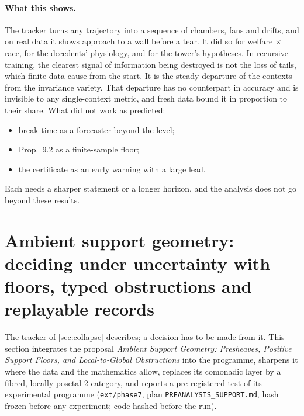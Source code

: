 \documentclass[11pt]{article}
\theoremstyle{definition}
\theoremstyle{remark}
\begin{document}
\paragraph{What this shows.} The tracker turns any trajectory into a sequence of chambers, fans and drifts, and on real data it shows
approach to a wall before a tear. It did so for welfare $\times$ race, for the decedents' physiology, and for the tower's hypotheses.
In recursive training, the clearest signal of information being destroyed is not the loss of tails, which finite data cause from the
start. It is the steady departure of the contexts from the invariance variety. That departure has no counterpart in accuracy and is
invisible to any single-context metric, and fresh data bound it in proportion to their share. What did not work as predicted:
\begin{itemize}[leftmargin=*,nosep]
\item break time as a forecaster beyond the level;
\item Prop.~9.2 as a finite-sample floor;
\item the certificate as an early warning with a large lead.
\end{itemize}
Each needs a sharper statement or a longer horizon, and the analysis does not go beyond these results.

\section{Ambient support geometry: deciding under uncertainty with floors, typed obstructions and replayable records}\label{sec:support}

The tracker of \cref{sec:collapse} describes; a decision has to be made from it. This section integrates the proposal
\emph{Ambient Support Geometry: Presheaves, Positive Support Floors, and Local-to-Global Obstructions} \cite{SupportAmbience} into the
programme, sharpens it where the data and the mathematics allow, replaces its comonadic layer by a fibred, locally posetal
2-category, and reports a pre-registered test of its experimental programme (\texttt{ext/phase7}, plan
\texttt{PREANALYSIS\_SUPPORT.md}, hash frozen before any experiment; code hashed before the run).
\end{document}

